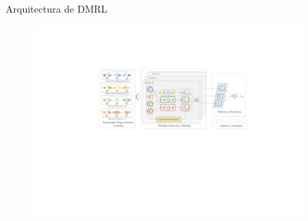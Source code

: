 \documentclass{beamer}
\begin{document}
\begin{frame}{Arquitectura de DMRL}
    \begin{figure}
        \centering
        \includegraphics[width=0.9\textwidth]{images/dmrl_arch.pdf}
    \end{figure}
\end{frame}

\end{document}
